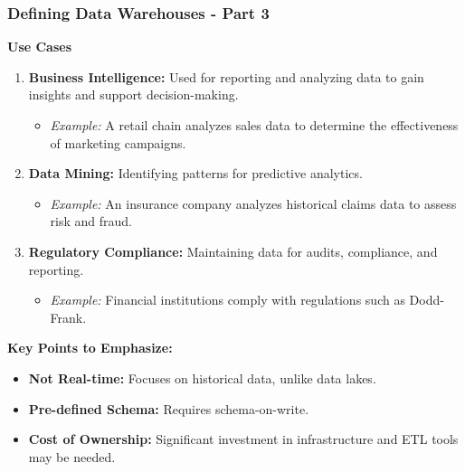 \documentclass[aspectratio=169]{beamer}
\begin{document}
\begin{frame}[fragile]
    \frametitle{Defining Data Warehouses - Part 3}
    
    \textbf{Use Cases}

    \begin{enumerate}
        \item \textbf{Business Intelligence:} Used for reporting and analyzing data to gain insights and support decision-making.
        \begin{itemize}
            \item \textit{Example:} A retail chain analyzes sales data to determine the effectiveness of marketing campaigns.
        \end{itemize}
        
        \item \textbf{Data Mining:} Identifying patterns for predictive analytics.
        \begin{itemize}
            \item \textit{Example:} An insurance company analyzes historical claims data to assess risk and fraud.
        \end{itemize}
        
        \item \textbf{Regulatory Compliance:} Maintaining data for audits, compliance, and reporting.
        \begin{itemize}
            \item \textit{Example:} Financial institutions comply with regulations such as Dodd-Frank.
        \end{itemize}
    \end{enumerate}

    \textbf{Key Points to Emphasize:}
    \begin{itemize}
        \item \textbf{Not Real-time:} Focuses on historical data, unlike data lakes.
        \item \textbf{Pre-defined Schema:} Requires schema-on-write.
        \item \textbf{Cost of Ownership:} Significant investment in infrastructure and ETL tools may be needed.
    \end{itemize}
\end{frame}
\end{document}
